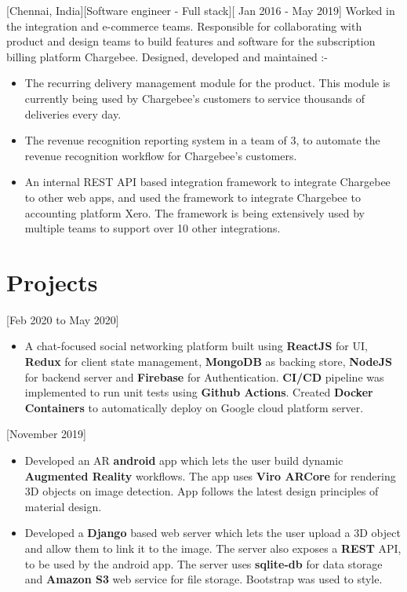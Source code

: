\documentclass{article}
\begin{document}
[\normalfont{}Chennai, India][Software engineer - Full stack][\normalfont{} Jan 2016 - May 2019]
\vspace{0.25cm}
Worked in the integration and e-commerce teams. Responsible for collaborating with product and design teams to build features and software for the subscription billing platform Chargebee. Designed, developed and maintained :-
\begin{itemize}
\item The recurring delivery management module for the product. This module is currently being used by Chargebee’s customers to service thousands of deliveries every day.
\item The revenue recognition reporting system in a team of 3, to automate the revenue recognition workflow for Chargebee’s customers.
\item An internal REST API based integration framework to integrate Chargebee to other web apps, and used the framework to integrate Chargebee to accounting platform Xero. The framework is being extensively used by multiple teams to support over 10 other integrations.
\end{itemize}


\section{Projects}

 [\normalfont{}Feb 2020 to May 2020]
\begin{itemize}
    \item A chat-focused social networking platform built using \textbf{ReactJS} for UI, \textbf{Redux} for client state management, \textbf{MongoDB} as backing store, \textbf{NodeJS} for backend server and \textbf{Firebase} for Authentication. \textbf{CI/CD} pipeline was implemented to run unit tests using \textbf{Github Actions}. Created \textbf{Docker Containers} to automatically deploy on Google cloud platform server.
\end{itemize} 

 [\normalfont{}November 2019]
\begin{itemize}
    \item Developed an AR \textbf{android} app which lets the user build dynamic \textbf{Augmented Reality} workflows. The app uses \textbf{Viro ARCore} for rendering 3D objects on image detection. App follows the latest design principles of material design.
    \item Developed a \textbf{Django} based web server which lets the user upload a 3D object and allow them to link it to the image. The server also exposes a \textbf{REST} API, to be used by the android app. The server uses \textbf{sqlite-db} for data storage and \textbf{Amazon S3} web service for file storage. Bootstrap was used to style.
\end{itemize} 
\end{document}
